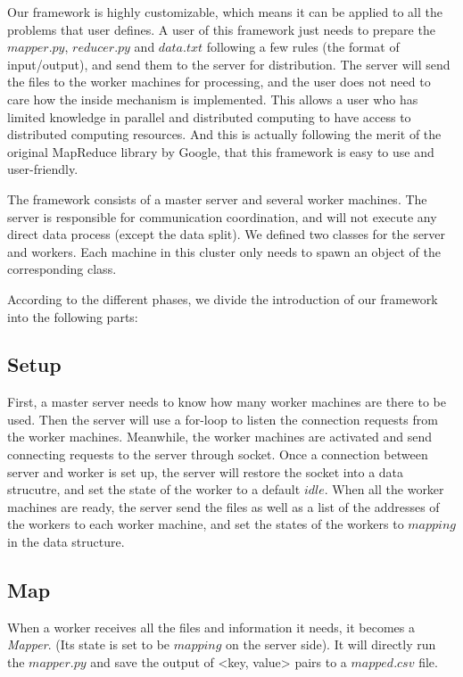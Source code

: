 \documentclass{article}
\begin{document}
Our framework is highly customizable, which means it can be applied to all the problems that user defines. A user of this framework just needs to prepare the $mapper.py$, $reducer.py$ and $data.txt$ following a few rules (the format of input/output), and send them to the server for distribution. The server will send the files to the worker machines for processing, and the user does not need to care how the inside mechanism is implemented. This allows a user who has limited knowledge in parallel and distributed computing to have access to distributed computing resources. And this is actually following the merit of the original MapReduce library by Google, that this framework is easy to use and user-friendly.

The framework consists of a master server and several worker machines. The server is responsible for communication coordination, and will not execute any direct data process (except the data split). We defined two classes for the server and workers. Each machine in this cluster only needs to spawn an object of the corresponding class.



According to the different phases, we divide the introduction of our framework into the following parts:
	\subsection{Setup}
		First, a master server needs to know how many worker machines are there to be used. Then the server will use a for-loop to listen the connection requests from the worker machines. Meanwhile, the worker machines are activated and send connecting requests to the server through socket. Once a connection between server and worker is set up, the server will restore the socket into a data strucutre, and set the state of the worker to a default $idle$. When all the worker machines are ready, the server send the files as well as a list of the addresses of the workers to each worker machine, and set the states of the workers to $mapping$ in the data structure.
	
	\subsection{Map}
		When a worker receives all the files and information it needs, it becomes a \textit{Mapper}. (Its state is set to be $mapping$ on the server side). It will directly run the $mapper.py$ and save the output of <key, value> pairs to a $mapped.csv$ file.
	
\end{document}
